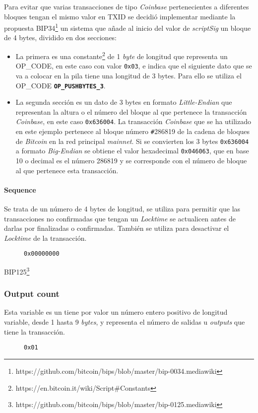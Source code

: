 \documentclass{article}
\begin{document}
    Para evitar que varias transacciones de tipo \textit{Coinbase} pertenecientes a diferentes bloques tengan el mismo valor en TXID se decidió implementar mediante la propuesta BIP34\footnote{https://github.com/bitcoin/bips/blob/master/bip-0034.mediawiki} un sistema que añade al inicio del valor de \textit{scriptSig} un bloque de 4 bytes, dividido en dos secciones:
    
    \begin{itemize}
    \item La primera es una constante\footnote{https://en.bitcoin.it/wiki/Script\#Constants} de 1 \textit{byte} de longitud que representa un OP\_CODE, en este caso con valor \texttt{0x03}, e indica que el siguiente dato que se va a colocar en la pila tiene una longitud de 3 bytes. Para ello se utiliza el OP\_CODE \textbf{\texttt{OP\_PUSHBYTES\_3}}.
    \item La segunda sección es un dato de 3 bytes en formato \textit{Little-Endian} que representan la altura o el número del bloque al que pertenece la transacción \textit{Coinbase}, en este caso \texttt{0x636004}. La transacción \textit{Coinbase} que se ha utilizado en este ejemplo pertenece al bloque número \texttt{\#}286819 de la cadena de bloques de \textit{Bitcoin} en la red principal \textit{mainnet}. Si se convierten los 3 bytes \texttt{0x636004} a formato \textit{Big-Endian} se obtiene el valor hexadecimal \texttt{0x046063}, que en base 10 o decimal es el número 286819 y se corresponde con el número de bloque al que pertenece esta transacción.
    \end{itemize}
    
    \paragraph{Sequence}
    Se trata de un número de 4 bytes de longitud, se utiliza para permitir que las transacciones no confirmadas que tengan un \textit{Locktime} se actualicen antes de darlas por finalizadas o confirmadas. También se utiliza para desactivar el \textit{Locktime} de la transacción.
    \begin{figure}[H]
        \texttt{0x00000000}
    \end{figure}
    BIP125\footnote{https://github.com/bitcoin/bips/blob/master/bip-0125.mediawiki}
    
    \subsubsection{Output count}
    Esta variable es un tiene por valor un número entero positivo de longitud variable, desde 1 hasta 9 \textit{bytes}, y representa el número de salidas u \textit{outputs} que tiene la transacción.
    \begin{figure}[H]
        \texttt{0x01}
    \end{figure}
    
\end{document}
